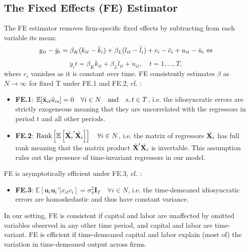 \documentclass[11pt]{article}
\begin{document}
\subsection{The Fixed Effects (FE) Estimator}
The FE estimator removes firm-specific fixed effects by subtracting from each variable its mean: 
\begin{equation*}
    y_{it}-\Bar{y}_i=\beta_K(k_{it}-\Bar{k}_i)+\beta_L(l_{it}-\Bar{l}_i)+c_i-\Bar{c}_i+u_{it}-\Bar{u}_i \Leftrightarrow
\end{equation*}
\begin{equation}
\label{FE_model}
    \ddot{y}_it = \beta_K\ddot{k}_{it}+\beta_L\ddot{l}_{it}+\ddot{u}_{it}, \quad t=1,...,T, 
\end{equation}
where $c_i$ vanishes as it is constant over time. 
FE consistently estimates $\beta$ as $N\rightarrow\infty$ for fixed T under FE.1 and FE.2, cf. \cite{Wooldrige_2010_10}:
\begin{itemize}
    \item[] \textbf{FE.1}: $\mathbb{E}[\Ddot{\textbf{x}}_{it}\Ddot{u}_{is}]=0 \quad \forall i\in N \quad \text{and} \quad s,t \in T$, i.e. the idiosyncratic errors are strictly exogeneous meaning that they are uncorrelated with the regressors in period $t$ and all other periods. 
    \item[] \textbf{FE.2}: $\text{Rank}\left[\mathbb{E}\left[\Ddot{\textbf{X}_i}'\ddot{\textbf{X}_i}\right]\right] \quad \forall i\in N$, i.e. the matrix of regressors $\Ddot{\textbf{X}_i}$ has full rank meaning that the matrix product $\Ddot{\textbf{X}}'\ddot{\textbf{X}_i}$ is invertable. This assumption rules out the presence of time-invariant regressors in our model. 
\end{itemize}
FE is asymptotically efficient under FE.3, cf. \cite{Wooldrige_2010_10}:
\begin{itemize}
    \item[] \textbf{FE.3}: $\mathbb{E}\left[\textbf{u}_i\textbf{u}_i'|x_{it} c_i \right]=\sigma_u^2 \textbf{I}_T \quad \forall i \in N$, i.e. the time-demeaned idiosyncratic errors are homoskedastic and thus have constant variance.  
\end{itemize}
In our setting, FE is consistent if capital and labor are unaffected by omitted variables observed in any other time period, and capital and labor are time-variant. FE is efficient if time-demeaned capital and labor explain (most of) the variation in time-demeaned output across firms.  
\end{document}
